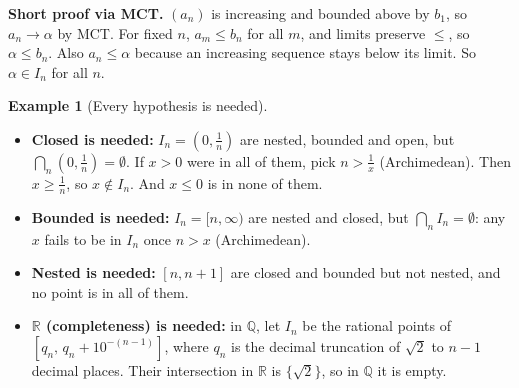 \documentclass[11pt]{article}
\theoremstyle{definition}
\newtheorem{ex}[defn]{Example}
\newcommand{\Q}{\mathbb{Q}}
\newcommand{\R}{\mathbb{R}}
\newcommand{\key}[1]{\textcolor{red!70!black}{\textbf{#1}}}
\begin{document}
\noindent\key{Short proof via MCT.} $(a_n)$ is increasing and bounded
above by $b_1$, so $a_n\to\alpha$ by MCT. For fixed $n$, $a_m\le b_n$ for
all $m$, and limits preserve $\le$, so $\alpha\le b_n$. Also
$a_n\le\alpha$ because an increasing sequence stays below its limit. So
$\alpha\in I_n$ for all $n$.

\begin{ex}[Every hypothesis is needed]\label{ex:nitcounter}
\leavevmode
\begin{itemize}[nosep]
  \item \textbf{Closed is needed:} $I_n=(0,\frac1n)$ are nested, bounded
        and open, but $\bigcap_n(0,\frac1n)=\emptyset$. If $x>0$ were in
        all of them, pick $n>\frac1x$ (Archimedean). Then $x\ge\frac1n$,
        so $x\notin I_n$. And $x\le0$ is in none of them.
  \item \textbf{Bounded is needed:} $I_n=[n,\infty)$ are nested and
        closed, but $\bigcap_n I_n=\emptyset$: any $x$ fails to be in
        $I_n$ once $n>x$ (Archimedean).
  \item \textbf{Nested is needed:} $[n,n+1]$ are closed and bounded but not
        nested, and no point is in all of them.
  \item \textbf{$\R$ (completeness) is needed:} in $\Q$, let $I_n$ be the
        rational points of $[q_n,\,q_n+10^{-(n-1)}]$, where $q_n$ is the
        decimal truncation of $\sqrt2$ to $n-1$ decimal places. Their
        intersection in $\R$ is $\{\sqrt2\}$, so in $\Q$ it is empty.
\end{itemize}
\end{ex}
\end{document}
